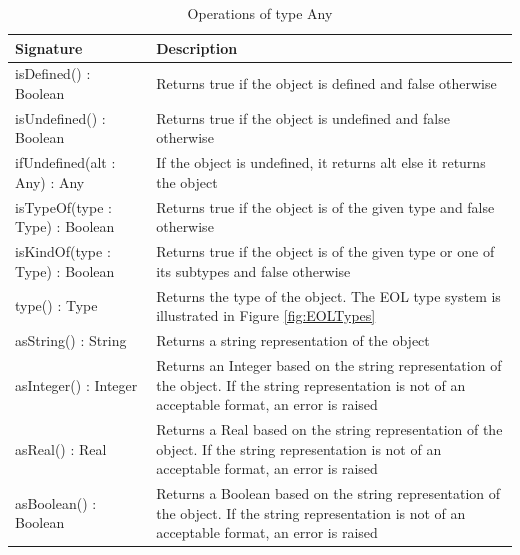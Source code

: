 \begin{longtable} {|p{5.5cm}|p{6.5cm}|}
			
			\caption{Operations of type Any}
			\label{tab:AnyOperations}\\
			
			\hline
							
			\textbf{Signature} & \textbf{Description} \\\hline
			
			isDefined() : Boolean & Returns true if the object is defined and false otherwise \\\hline
			
			isUndefined() : Boolean & Returns true if the object is undefined and false otherwise \\\hline
			
			ifUndefined(alt : Any) : Any & If the object is undefined, it returns alt else it returns the object \\\hline
			
			isTypeOf(type : Type) : Boolean & Returns true if the object is of the given type and false otherwise \\\hline
			
			isKindOf(type : Type) : Boolean & Returns true if the object is of the given type or one of its subtypes and false otherwise \\\hline
			
			type() : Type & Returns the type of the object. The EOL type system is illustrated in Figure \ref{fig:EOLTypes} \\\hline
			
			asString() : String & Returns a string representation of the object \\\hline
			
			asInteger() : Integer & Returns an Integer based on the string representation of the object. If the string representation is not of an acceptable format, an error is raised \\\hline
			
			asReal() : Real & Returns a Real based on the string representation of the object. If the string representation is not of an acceptable format, an error is raised \\\hline
			
			asBoolean() : Boolean & Returns a Boolean based on the string representation of the object. If the string representation is not of an acceptable format, an error is raised \\\hline
			

\end{longtable}
